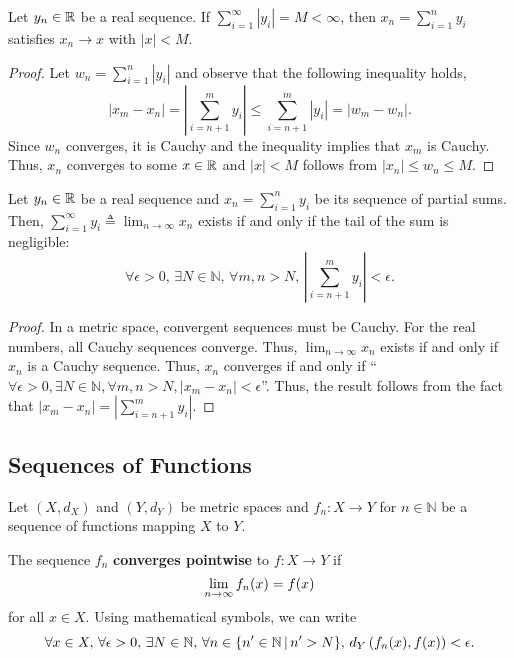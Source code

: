\begin{lemma} \label{lem:abs_sum_convergence}
Let $y_n \in \mathbb{R}$ be a real sequence.
If $\sum_{i=1}^\infty |y_i| = M < \infty$, then $x_n = \sum_{i=1}^n y_i$ satisfies $x_n \to x$ with $|x|<M$.
\end{lemma}
\begin{proof}
Let $w_n = \sum_{i=1}^n |y_i|$ and observe that the following inequality holds,
\[|x_m - x_n| = \left| \sum_{i=n+1}^m y_i \right| \leq \sum_{i=n+1}^m |y_i| = | w_m - w_n|. \]
Since $w_n$ converges, it is Cauchy and %
the inequality implies that $x_m$ is Cauchy.
Thus, $x_n$ converges to some $x\in \mathbb{R}$ and $|x| < M$ follows from  $|x_n| \leq w_n \leq M$.
\end{proof}



\begin{lemma} \label{lem:sum_convergence}
Let $y_n \in \mathbb{R}$ be a real sequence and $x_n = \sum_{i=1}^n y_i$ be its sequence of partial sums.
Then, $\sum_{i=1}^\infty y_i \triangleq \lim_{n\to \infty} x_n$ exists if and only if the tail of the sum is negligible:
\[ \forall \epsilon > 0, \, \exists N \in \mathbb{N}, \, \forall m,n>N, \, \left| \sum_{i=n+1}^m y_i \right| < \epsilon. \]
\end{lemma}
\begin{proof}
In a metric space, convergent sequences must be Cauchy.
For the real numbers, all Cauchy sequences converge.
Thus, $\lim_{n\to\infty} x_n$ exists if and only if $x_n$ is a Cauchy sequence.
Thus, $x_n$ converges if and only if ``$\forall \epsilon>0, \exists N\in \mathbb{N}, \forall m,n>N, |x_m - x_n|< \epsilon$''.
Thus, the result follows from the fact that $|x_m - x_n| = \left| \sum_{i=n+1}^m y_i \right|$.
\end{proof}



\subsection{Sequences of Functions}

Let $(X,d_X)$ and $(Y,d_Y)$ be metric spaces and
$f_n \colon X \to Y$ for $n\in \mathbb{N}$ be a sequence of functions mapping $X$ to $Y$.

\begin{definition}
The sequence $f_n$ \textbf{converges pointwise} to $f\colon X \to Y$ if \vspace{-1mm}
\[ \lim_{n\to \infty} f_n (x) = f(x) \vspace*{-1mm} \]
for all $x \in X$.
Using mathematical symbols, we can write \vspace{-1mm}
\[ \forall x\in X, \, \forall \epsilon > 0, \, \exists N\in \mathbb{N}, \, \forall n \in \{ n' \in \mathbb{N}\,|\, n'>N \}, \, d_Y \left( f_n(x),f(x) \right) < \epsilon. \vspace*{-1mm} \]
\end{definition}

